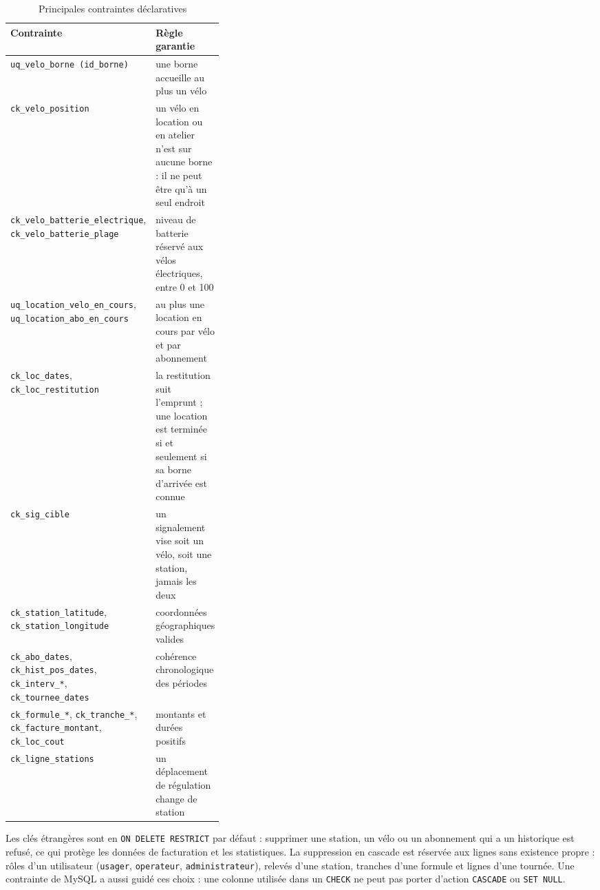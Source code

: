 \begin{table}[htbp]\centering\small
	\begin{tabularx}{\linewidth}{>{\raggedright\arraybackslash}p{0.36\linewidth} X}
		\toprule
		\textbf{Contrainte} & \textbf{Règle garantie} \\
		\midrule
		\texttt{uq\_velo\_borne (id\_borne)} & une borne accueille au plus un vélo \\
		\texttt{ck\_velo\_position} & un vélo en location ou en atelier n'est sur aucune borne : il ne peut être qu'à un seul endroit \\
		\texttt{ck\_velo\_batterie\_electrique}, \texttt{ck\_velo\_batterie\_plage} & niveau de batterie réservé aux vélos électriques, entre 0 et 100 \\
		\texttt{uq\_location\_velo\_en\_cours}, \texttt{uq\_location\_abo\_en\_cours} & au plus une location en cours par vélo et par abonnement \\
		\texttt{ck\_loc\_dates}, \texttt{ck\_loc\_restitution} & la restitution suit l'emprunt ; une location est terminée si et seulement si sa borne d'arrivée est connue \\
		\texttt{ck\_sig\_cible} & un signalement vise soit un vélo, soit une station, jamais les deux \\
		\texttt{ck\_station\_latitude}, \texttt{ck\_station\_longitude} & coordonnées géographiques valides \\
		\texttt{ck\_abo\_dates}, \texttt{ck\_hist\_pos\_dates}, \texttt{ck\_interv\_*}, \texttt{ck\_tournee\_dates} & cohérence chronologique des périodes \\
		\texttt{ck\_formule\_*}, \texttt{ck\_tranche\_*}, \texttt{ck\_facture\_montant}, \texttt{ck\_loc\_cout} & montants et durées positifs \\
		\texttt{ck\_ligne\_stations} & un déplacement de régulation change de station \\
		\bottomrule
	\end{tabularx}
	\caption{Principales contraintes déclaratives}\label{tab:contraintes}
\end{table}

Les clés étrangères sont en \texttt{ON DELETE RESTRICT} par défaut : supprimer une station, un vélo ou un abonnement qui a un historique est refusé, ce qui protège les données de facturation et les statistiques. La suppression en cascade est réservée aux lignes sans existence propre : rôles d'un utilisateur (\texttt{usager}, \texttt{operateur}, \texttt{administrateur}), relevés d'une station, tranches d'une formule et lignes d'une tournée. Une contrainte de MySQL a aussi guidé ces choix : une colonne utilisée dans un \texttt{CHECK} ne peut pas porter d'action \texttt{CASCADE} ou \texttt{SET NULL}.

